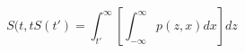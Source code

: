 \begin{equation}
S(t,tS(t') = \int_{t'}^{\infty} \left[ \int_{-\infty}^\infty p(z,x) dx\right] dz
\end{equation}